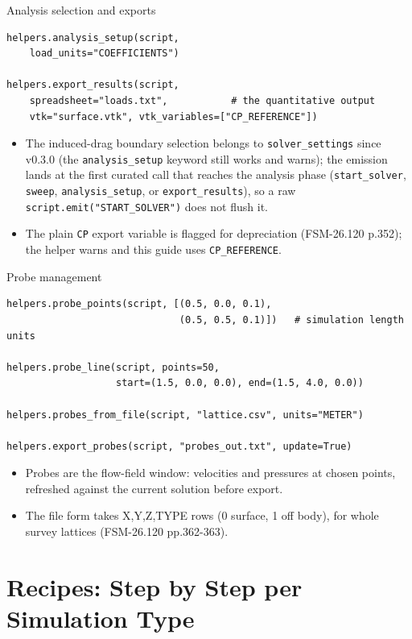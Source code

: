 \documentclass[aspectratio=169,10pt]{beamer}
\newcommand{\code}[1]{\texttt{\small #1}}
\begin{document}
\begin{frame}[fragile]{Analysis selection and exports}
\begin{lstlisting}
helpers.analysis_setup(script,
    load_units="COEFFICIENTS")

helpers.export_results(script,
    spreadsheet="loads.txt",           # the quantitative output
    vtk="surface.vtk", vtk_variables=["CP_REFERENCE"])
\end{lstlisting}
  \begin{itemize}
    \item The induced-drag boundary selection belongs to \code{solver\_settings} since v0.3.0 (the \code{analysis\_setup} keyword still works and warns); the emission lands at the first curated call that reaches the analysis phase (\code{start\_solver}, \code{sweep}, \code{analysis\_setup}, or \code{export\_results}), so a raw \code{script.emit("START\_SOLVER")} does not flush it.
    \item The plain \code{CP} export variable is flagged for depreciation (FSM-26.120 p.352); the helper warns and this guide uses \code{CP\_REFERENCE}.
  \end{itemize}
\end{frame}

\begin{frame}{Probe management}
\begin{lstlisting}
helpers.probe_points(script, [(0.5, 0.0, 0.1),
                              (0.5, 0.5, 0.1)])   # simulation length units

helpers.probe_line(script, points=50,
                   start=(1.5, 0.0, 0.0), end=(1.5, 4.0, 0.0))

helpers.probes_from_file(script, "lattice.csv", units="METER")

helpers.export_probes(script, "probes_out.txt", update=True)
\end{lstlisting}
  \begin{itemize}
    \item Probes are the flow-field window: velocities and pressures at chosen points, refreshed against the current solution before export.
    \item The file form takes X,Y,Z,TYPE rows (0 surface, 1 off body), for whole survey lattices (FSM-26.120 pp.362-363).
  \end{itemize}
\end{frame}

\section{Recipes: Step by Step per Simulation Type}
\end{document}
